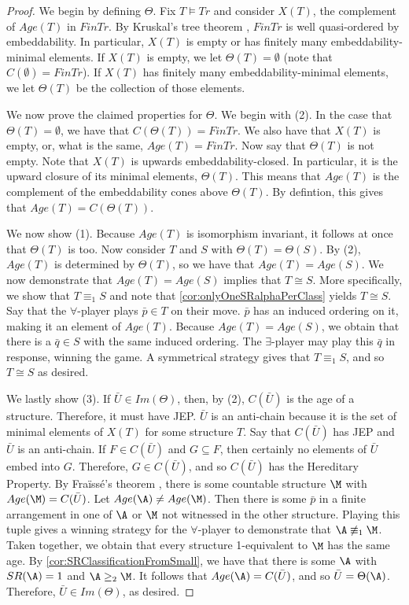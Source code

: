 \documentclass[10pt,a4paper]{amsart}
\renewcommand{\-}{\text{-}}
\begin{document}
\begin{proof}
We begin by defining $\Theta$.
Fix $T\models Tr$ and consider $X(T)$, the complement of $Age(T)$ in $FinTr$.
By Kruskal's tree theorem \cite{Kru60}, $FinTr$ is well quasi-ordered by embeddability.
In particular, $X(T)$ is empty or has finitely many embeddability-minimal elements.
If $X(T)$ is empty, we let $\Theta(T)=\emptyset$ (note that $C(\emptyset)=FinTr$).
If $X(T)$ has finitely many embeddability-minimal elements, we let $\Theta(T)$ be the collection of those elements.

We now prove the claimed properties for $\Theta$.
We begin with (2).
In the case that $\Theta(T)=\emptyset$, we have that $C(\Theta(T))=FinTr$.
We also have that $X(T)$ is empty, or, what is the same, $Age(T)=FinTr$.
Now say that $\Theta(T)$ is not empty.
Note that $X(T)$ is upwards embeddability-closed.
In particular, it is the upward closure of its minimal elements, $\Theta(T)$.
This means that $Age(T)$ is the complement of the embeddability cones above $\Theta(T)$.
By defintion, this gives that $Age(T)= C(\Theta(T))$.

We now show (1).
Because $Age(T)$ is isomorphism invariant, it follows at once that $\Theta(T)$ is too.
Now consider $T$ and $S$ with $\Theta(T)=\Theta(S)$.
By (2), $Age(T)$ is determined by $\Theta(T)$, so we have that $Age(T)=Age(S)$.
We now demonstrate that $Age(T)=Age(S)$ implies that $T\cong S$.
More specifically, we show that $T\equiv_1S$ and note that \cref{cor:onlyOneSRalphaPerClass} yields $T\cong S$.
Say that the $\forall$-player plays $\bar{p}\in T$ on their move.
$\bar{p}$ has an induced ordering on it, making it an element of $Age(T)$.
Because $Age(T)=Age(S)$, we obtain that there is a $\bar{q}\in S$ with the same induced ordering.
The $\exists$-player may play this $\bar{q}$ in response, winning the game.
A symmetrical strategy gives that $T\equiv_1S$, and so $T\cong S$ as desired.

We lastly show (3).
If $\bar{U}\in Im(\Theta)$, then, by (2), $C(\bar{U})$ is the age of a structure.
Therefore, it must have JEP.
$\bar{U}$ is an anti-chain because it is the set of minimal elements of $X(T)$ for some structure $T$.
Say that $C(\bar{U})$ has JEP and $\bar{U}$ is an anti-chain.
If $F\in C(\bar{U})$ and $G\subseteq F$, then certainly no elements of $\bar{U}$ embed into $G$.
Therefore, $G\in C(\bar{U})$, and so $C(\bar{U})$ has the Hereditary Property.
By Fraïssé's theorem \cite[Chapter 7.1]{Hod93}, there is some countable structure $\M$ with $Age(\M)=C(\bar{U})$.
Let $Age(\A)\neq Age(\M)$.
Then there is some $\bar{p}$ in a finite arrangement in one of $\A$ or $\M$ not witnessed in the other structure.
Playing this tuple gives a winning strategy for the $\forall$-player to demonstrate that $\A\not\equiv_1\M$.
Taken together, we obtain that every structure 1-equivalent to $\M$ has the same age.
By \cref{cor:SRClassificationFromSmall}, we have that there is some $\A$ with $SR(\A)=1$ and $\A\geq_2 \M$.
It follows that $Age(\A)=C(\bar{U})$, and so $\bar{U}=\Theta(\A)$.
Therefore, $\bar{U}\in Im(\Theta)$, as desired.
\end{proof}
\end{document}
